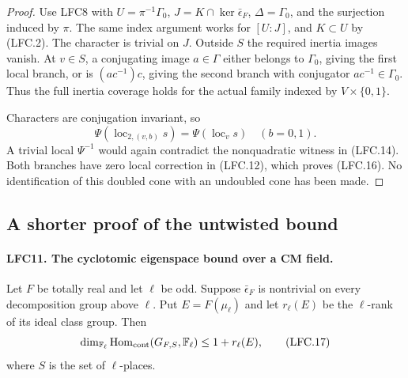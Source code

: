 \documentclass[11pt,a4paper]{article}
\numberwithin{equation}{section}
\theoremstyle{remark}\newtheorem{remark}[theorem]{Remark}
\begin{document}
\begin{proof}
Use LFC8 with \(U=\pi^{-1}\Gamma_0\),
\(J=K\cap\ker\bar\epsilon_F\), \(\Delta=\Gamma_0\), and
the surjection induced by \(\pi\).  The same index argument
works for \([U:J]\), and \(K\subset U\) by (LFC.2).
The character is trivial on \(J\).
Outside \(S\) the required inertia images vanish.
At \(v\in S\), a conjugating image \(a\in\Gamma\) either
belongs to \(\Gamma_0\), giving the first local branch,
or is \((ac^{-1})c\), giving the second branch with
conjugator \(ac^{-1}\in\Gamma_0\).
Thus the full inertia coverage holds for the actual
family indexed by \(V\times\{0,1\}\).

Characters are conjugation invariant, so
\[
 \Psi(\operatorname{loc}_{2,(v,b)}s)
                  =\Psi(\operatorname{loc}_v s)
                     \quad(b=0,1).
\]
A trivial local \(\Psi^{-1}\) would again contradict the
nonquadratic witness in (LFC.14).
Both branches have zero local correction in (LFC.12),
which proves (LFC.16).  No identification of this doubled
cone with an undoubled cone has been made.
\end{proof}

\subsection{A shorter proof of the untwisted bound}

\paragraph{LFC11. The cyclotomic eigenspace bound over a CM field.}
\label{claim:LFC11}
Let \(F\) be totally real and let \(\ell\) be odd.
Suppose \(\bar\epsilon_F\) is nontrivial on every
decomposition group above \(\ell\).
Put \(E=F(\mu_\ell)\) and let \(r_\ell(E)\) be the
\(\ell\)-rank of its ideal class group.  Then
\[
 \dim_{\mathbb F_\ell}
   \operatorname{Hom}_{\rm cont}
      (G_{F,S},\mathbb F_\ell)\le 1+r_\ell(E),
                                                        \tag{LFC.17}
\]
where \(S\) is the set of \(\ell\)-places.
\end{document}
